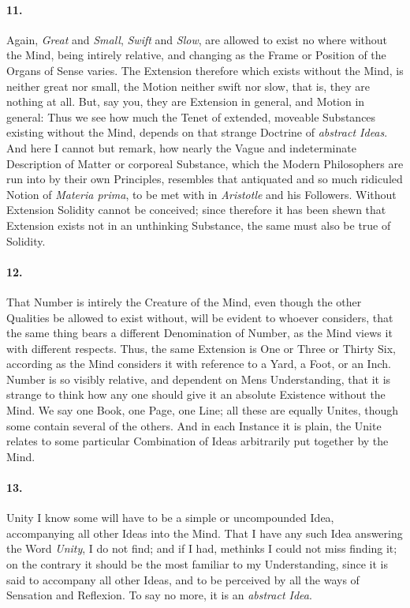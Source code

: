 \documentclass[]{article}
\newenvironment{sectionbody}{}{}
\begin{document}
\begin{sectionbody}
\paragraph{11.} Again, \emph{Great} and \emph{Small}, \emph{Swift} and
\emph{Slow}, are allowed to exist no where without the Mind,
being intirely relative, and changing as the Frame or Position of
the Organs of Sense varies.  The Extension therefore which exists
without the Mind, is neither great nor small, the Motion neither
swift nor slow, that is, they are nothing at all.  But, say you,
they are Extension in general, and Motion in general: Thus we see
how much the Tenet of extended, moveable Substances existing
without the Mind, depends on that strange Doctrine of
\emph{abstract Ideas}.  And here I cannot but remark, how
nearly the Vague and indeterminate Description of Matter or
corporeal Substance, which the Modern Philosophers are run into
by their own Principles, resembles that antiquated and so much
ridiculed Notion of \emph{Materia prima}, to be met with in
\emph{Aristotle} and his Followers.  Without Extension Solidity
cannot be conceived; since therefore it has been shewn that
Extension exists not in an unthinking Substance, the same must
also be true of Solidity.



\paragraph{12.} That Number is intirely the Creature of the Mind, even though the
other Qualities be allowed to exist without, will be evident to
whoever considers, that the same thing bears a different
Denomination of Number, as the Mind views it with different
respects.  Thus, the same Extension is One or Three or Thirty
Six, according as the Mind considers it with reference to a Yard,
a Foot, or an Inch.  Number is so visibly relative, and dependent
on Mens Understanding, that it is strange to think how any one
should give it an absolute Existence without the Mind.  We say
one Book, one Page, one Line; all these are equally Unites,
though some contain several of the others.  And in each Instance
it is plain, the Unite relates to some particular Combination of
Ideas arbitrarily put together by the Mind.



\paragraph{13.} Unity I know some will have to be a simple or uncompounded Idea,
accompanying all other Ideas into the Mind.  That I have any such
Idea answering the Word \emph{Unity}, I do not find; and if I
had, methinks I could not miss finding it; on the contrary it
should be the most familiar to my Understanding, since it is said
to accompany all other Ideas, and to be perceived by all the ways
of Sensation and Reflexion.  To say no more, it is an
\emph{abstract Idea}.




\end{sectionbody}
\end{document}

